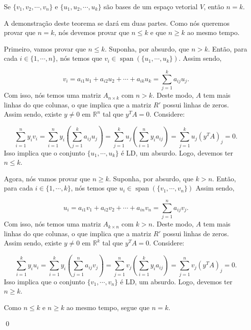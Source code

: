 \begin{Theorem}
	Se $\{v_1, v_2, \cdots, v_n\}$ e $\{u_1, u_2, \cdots, u_k\}$ são bases de um espaço vetorial $V$, então $n = k$.
\end{Theorem}

\begin{Proof}
	A demonstração deste teorema se dará em duas partes. Como nós queremos provar que $n = k$, nós devemos provar que $n\leq k$ e que $n\geq k$ ao mesmo tempo.
	
	Primeiro, vamos provar que $n\leq k$. Suponha, por absurdo, que $n > k$. Então, para cada $i\in\{1, \cdots, n\}$, nós temos que $v_i\in\operatorname{span}(\{u_1, \cdots, u_k\})$. Assim sendo,
	
	$$
	v_i = a_{i1}u_1 + a_{i2}u_2 + \cdots + a_{ik}u_k = \sum\limits_{j = 1}^{k} a_{ij}u_j.
	$$
	Com isso, nós temos uma matriz $A_{n\times k}$ com $n > k$. Deste modo, $A$ tem mais linhas do que colunas, o que implica que a matriz $R'$ possui linhas de zeros. Assim sendo, existe $y\neq 0$ em $\mathbb{R}^n$ tal que $y^TA = 0$. Considere:
	
	$$
	\sum\limits_{i = 1}^{n} y_iv_i = \sum\limits_{i = 1}^{n} y_i\left(\sum\limits_{j = 1}^{k}a_{ij}u_j\right) = \sum\limits_{j = 1}^{k} u_j\left(\sum\limits_{i = 1}^{n}y_ia_{ij}\right) = \sum\limits_{j = 1}^{k}u_j (y^TA)_j = 0.
	$$
	Isso implica que o conjunto $\{u_1, \cdots, u_k\}$ é LD, um absurdo. Logo, devemos ter $n\leq k$.
	
	Agora, nós vamos provar que $n\geq k$. Suponha, por absurdo, que $k > n$. Então, para cada $i\in\{1, \cdots, k\}$, nós temos que $u_i\in\operatorname{span}(\{v_1, \cdots, v_n\})$ Assim sendo,
	
	$$
	u_i  = a_{i1}v_1 + a_{i2}v_2 + \cdots + a_{in}v_n = \sum\limits_{j = 1}^{n} a_{ij}v_j.
	$$
	Com isso, nós temos uma matriz $A_{k\times n}$ com $k > n$. Deste modo, $A$ tem mais linhas do que colunas, o que implica que a matriz $R'$ possui linhas de zeros. Assim sendo, existe $y\neq 0$ em $\mathbb{R}^k$ tal que $y^TA = 0$. Considere:
	
	$$
	\sum\limits_{i = 1}^{k} y_iu_i = \sum\limits_{i = 1}^{k} y_i \left(\sum\limits_{j = 1}^{n} a_{ij}v_j\right) = \sum\limits_{j = 1}^{n} v_j \left(\sum\limits_{i = 1}^{k} y_ia_{ij}\right) = \sum\limits_{j = 1}^{n} v_j (y^TA)_j = 0.
	$$
	Isso implica que o conjunto $\{v_1, \cdots, v_n\}$ é LD, um absurdo. Logo, devemos ter $n\geq k$.
	
	Como $n\leq k$ e $n\geq k$ ao mesmo tempo, segue que $n = k$.
	
	\qed
\end{Proof}

